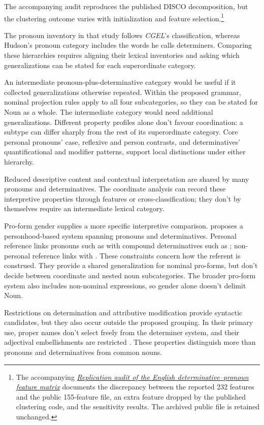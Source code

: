 \documentclass[12pt]{article}
\begin{document}
The accompanying audit reproduces the published DISCO decomposition, but the clustering outcome varies with initialization and feature selection.\footnote{The accompanying \href{run:matrix-audit.pdf}{\textit{Replication audit of the English determinative--pronoun feature matrix}} documents the discrepancy between the reported 232 features and the public 155-feature file, an extra feature dropped by the published clustering code, and the sensitivity results. The archived public file is retained unchanged.}

The pronoun inventory in that study follows \textit{CGEL}'s classification, whereas Hudson's pronoun category includes the words he calls determiners. Comparing these hierarchies requires aligning their lexical inventories and asking which generalizations can be stated for each superordinate category.

An intermediate pronoun-plus-determinative category would be useful if it collected generalizations otherwise repeated. Within the proposed grammar, nominal projection rules apply to all four subcategories, so they can be stated for Noun as a whole. The intermediate category would need additional generalizations. Different property profiles alone don't favour coordination: a subtype can differ sharply from the rest of its superordinate category. Core personal pronouns' case, reflexive and person contrasts, and determinatives' quantificational and modifier patterns, support local distinctions under either hierarchy.

Reduced descriptive content and contextual interpretation are shared by many pronouns and determinatives. The coordinate analysis can record these interpretive properties through features or cross-classification; they don't by themselves require an intermediate lexical category.

Pro-form gender supplies a more specific interpretive comparison. \textcite{reynolds2025proformgender} proposes a personhood-based system spanning pronouns and determinatives. Personal reference links pronouns such as  with compound determinatives such as ; non-personal reference links  with . These constraints concern how the referent is construed. They provide a shared generalization for nominal pro-forms, but don't decide between coordinate and nested noun subcategories. The broader pro-form system also includes non-nominal expressions, so gender alone doesn't delimit Noun.

Restrictions on determination and attributive modification provide syntactic candidates, but they also occur outside the proposed grouping. In their primary use, proper names don't select freely from the determiner system, and their adjectival embellishments are restricted \citep[517, 519--520]{huddleston2002}. These properties distinguish more than pronouns and determinatives from common nouns.
\end{document}
